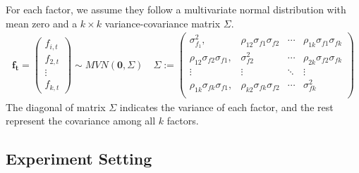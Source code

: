 

 For each factor, we assume they follow a multivariate normal distribution with mean zero and a $k\times k$ variance-covariance matrix $\Sigma$. 
\begin{align*}
\mathbf{f_t} = \begin{pmatrix}
f_{i,t}\\f_{2,t}\\\vdots\\f_{k,t}
\end{pmatrix} \sim MVN(\mathbf{0}, \Sigma) \quad
 \Sigma := 
\begin{pmatrix}
\sigma^2_{f_1}, & \rho_{12}\sigma_{f1}\sigma_{f2} &\cdots  & \rho_{1k}\sigma_{f1}\sigma_{fk}\\
\rho_{12}\sigma_{f2}\sigma_{f1}, & \sigma^2_{f2} &\cdots  & \rho_{2k}\sigma_{f2}\sigma_{fk}\\
\vdots & \vdots & \ddots & \vdots \\
\rho_{1k}\sigma_{fk}\sigma_{f1}, & \rho_{k2}\sigma_{fk}\sigma_{f2} &\cdots  & \sigma^2_{fk}\\
\end{pmatrix}
\end{align*}
The diagonal of matrix $\Sigma$ indicates the variance of each factor, and the rest represent the covariance among all $k$ factors.


	\subsection{Experiment Setting}\label{exp_set}



